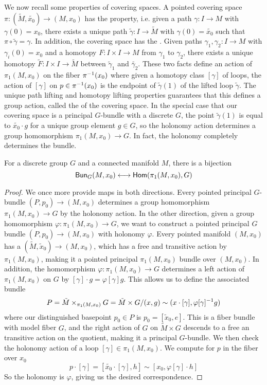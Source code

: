 %
We now recall some properties of covering spaces. A pointed covering space
$\pi : (\tilde{M}, \tilde{x_0}) \to (M, x_0)$ has the  property,
i.e. given a path $\gamma : I \to M$ with $\gamma(0) = x_0$, there exists a
unique path $\tilde{\gamma} : I \to \tilde{M}$ with $\gamma(0) = \tilde{x_0}$
such that $\pi \circ \tilde{\gamma} = \gamma$. In addition, the covering
space has the . Given paths
$\gamma_1, \gamma_2 : I \to M$ with $\gamma_i(0) = x_0$ and a homotopy
$F : I \times I \to M$ from $\gamma_1$ to $\gamma_2$, there exists a unique
homotopy $\tilde{F} : I \times I \to \tilde{M}$ between $\tilde{\gamma}_1$
and $\tilde{\gamma_2}$. These two facts define an action of $\pi_1(M, x_0)$
on the fiber $\pi^{-1}(x_0)$ where given a homotopy class $[\gamma]$ of
loops, the action of $[\gamma]$ on $p \in \pi^{-1}(x_0)$ is the endpoint
of $\tilde{\gamma}(1)$ of the lifted loop $\tilde{\gamma}$. The unique
path lifting and homotopy lifting properties guarantees that this defines
a group action, called the  of the covering space. In the
special case that our covering space is a principal $G$-bundle with a discrete $G$,
the point $\tilde{\gamma}(1)$ is equal to $\tilde{x_0} \cdot g$ for a unique
group element $g \in G$, so the holonomy action determines a group homomorphism
$\pi_1(M, x_0) \to G$. In fact, the holonomy completely determines the bundle.
%
\begin{thm}
For a discrete group $G$ and a connected manifold $M$, there is a bijection
\[
\mathsf{Bun}_G(M,x_0) \longleftrightarrow \mathsf{Hom}(\pi_1(M,x_0), G)
\]
\end{thm}
%
\begin{proof}
We once more provide maps in both directions. Every pointed principal $G$-bundle
$(P,p_0) \to (M, x_0)$ determines a group homomorphism $\pi_1(M,x_0) \to G$
by the holonomy action. In the other direction, given a group homomorphism
$\varphi : \pi_1(M, x_0) \to G$, we want to construct a pointed principal $G$
bundle $(P, p_0) \to (M, x_0)$ with holonomy $\varphi$. Every pointed manifold
$(M, x_0)$ has a  $(\tilde{M}, \tilde{x}_0) \to (M,x_0)$,
which has a free and transitive action by $\pi_1(M,x_0)$, making it a pointed
principal $\pi_1(M,x_0)$ bundle over $(M,x_0)$. In addition, the homomorphism
$\varphi : \pi_1(M, x_0) \to G$ determines a left action of $\pi_1(M,x_0)$
on $G$ by $[\gamma] \cdot g = \varphi[\gamma] g$. This allows us to define
the associated bundle
\[
P = \tilde{M} \times_{\pi_1(M, x_0)} G = \tilde{M} \times G
/ (x,g) \sim (x \cdot [\gamma], \varphi[\gamma]^{-1} g)
\]
where our distinguished basepoint $p_0 \in P$ is $p_0 = [\tilde{x}_0, e]$.
This is a fiber bundle with model fiber $G$, and the right action of $G$
on $\tilde{M} \times G$ descends to a free an transitive action on the quotient,
making it a principal $G$-bundle. We then check the holonomy action of a
loop $[\gamma] \in \pi_1(M, x_0)$. We compute for $p$ in the fiber over $x_0$
\[
p \cdot [\gamma] = [\tilde{x_0} \cdot [\gamma], h] \sim [x_0, \varphi[\gamma]\cdot h]
\]
So the holonomy is $\varphi$, giving us the desired correspondence.
\end{proof}
